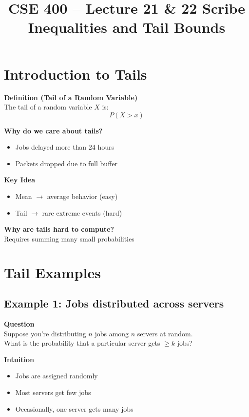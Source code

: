 \documentclass[12pt]{article}
\title{CSE 400 -- Lecture 21 \& 22 Scribe\\
Inequalities and Tail Bounds}
\date{}
\begin{document}
\maketitle

\section{Introduction to Tails}

\textbf{Definition (Tail of a Random Variable)}\\
The tail of a random variable $X$ is:
\[
P(X > x)
\]

\textbf{Why do we care about tails?}
\begin{itemize}
    \item Jobs delayed more than 24 hours
    \item Packets dropped due to full buffer
\end{itemize}

\textbf{Key Idea}
\begin{itemize}
    \item Mean $\rightarrow$ average behavior (easy)
    \item Tail $\rightarrow$ rare extreme events (hard)
\end{itemize}

\textbf{Why are tails hard to compute?}\\
Requires summing many small probabilities

\section{Tail Examples}

\subsection{Example 1: Jobs distributed across servers}

\textbf{Question}\\
Suppose you’re distributing $n$ jobs among $n$ servers at random.\\
What is the probability that a particular server gets $\geq k$ jobs?

\textbf{Intuition}
\begin{itemize}
    \item Jobs are assigned randomly
    \item Most servers get few jobs
    \item Occasionally, one server gets many jobs
\end{itemize}
\end{document}
